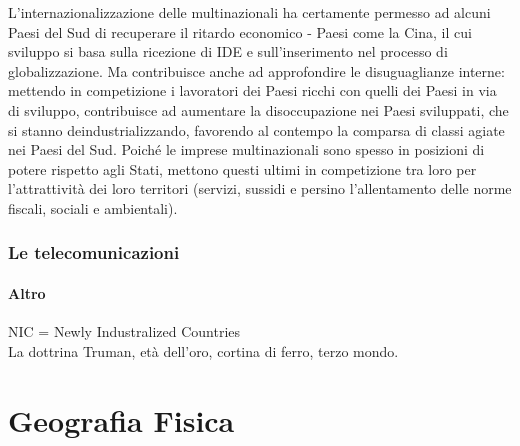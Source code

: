 \documentclass[a4paper]{article}
\begin{document}
L'internazionalizzazione delle multinazionali ha certamente permesso ad alcuni Paesi del Sud di
recuperare il ritardo economico - Paesi come la Cina, il cui sviluppo si basa sulla ricezione di IDE e
sull'inserimento nel processo di globalizzazione. Ma contribuisce anche ad approfondire le
disuguaglianze interne: mettendo in competizione i lavoratori dei Paesi ricchi con quelli dei Paesi
in via di sviluppo, contribuisce ad aumentare la disoccupazione nei Paesi sviluppati, che si stanno
deindustrializzando, favorendo al contempo la comparsa di classi agiate nei Paesi del Sud. Poiché
le imprese multinazionali sono spesso in posizioni di potere rispetto agli Stati, mettono questi
ultimi in competizione tra loro per l'attrattività dei loro territori (servizi, sussidi e persino
l'allentamento delle norme fiscali, sociali e ambientali).



\pagebreak

\section{Le telecomunicazioni}


\pagebreak

\subsection{Altro}

NIC = Newly Industralized Countries \\%

La dottrina Truman, età dell'oro, cortina di ferro, terzo mondo.

\pagebreak

\part{Geografia Fisica}
\end{document}
